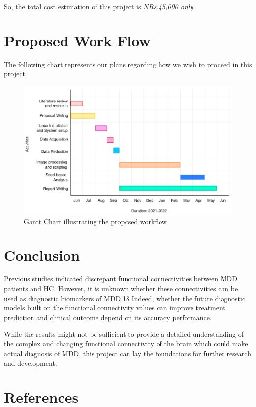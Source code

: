 ﻿\documentclass[12pt]{article}
\begin{document}
So, the total cost estimation \cite{ssdprice} of this project is
\textit{NRs.\hspace*{2pt}45,000 only}.

\newpage

\section{Proposed Work Flow}

The following chart represents our plans regarding how we wish to
proceed in this project.

\begin{figure}[H]
  \centering
  \includegraphics[width=1\textwidth]{proposed-workflow.png}
  \caption{Gantt Chart illustrating the proposed workflow}
\end{figure}

\section{Conclusion}

Previous studies indicated discrepant functional connectivities
between MDD patients and HC. However, it is unknown whether these
connectivities can be used as diagnostic biomarkers of MDD.18 Indeed,
whether the future diagnostic models built on the functional
connectivity values can improve treatment prediction and clinical
outcome depend on its accuracy performance.

While the results might not be sufficient to provide a detailed
understanding of the complex and changing functional connectivity of
the brain which could make actual diagnosis of MDD, this project can
lay the foundations for further research and development.

\newpage

\section*{References}
\printbibliography[heading=none]
\end{document}
